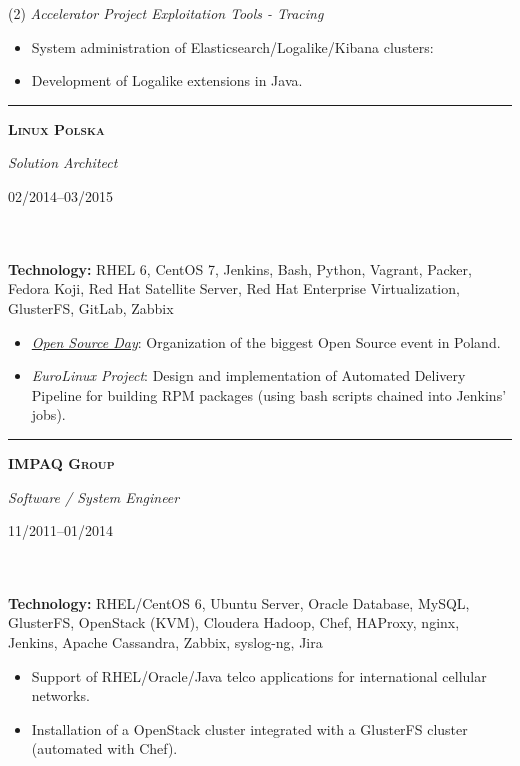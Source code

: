 \documentclass[$fontsize$, a4paper]{article}
\newcommand\textbox[1]{%
  \parbox{.333\textwidth}{#1}%
}
\begin{document}
\vspace{5pt}
(2) \emph{Accelerator Project Exploitation Tools - Tracing}
\begin{itemize}
  \item System administration of Elasticsearch/Logalike/Kibana clusters:
  \item Development of Logalike extensions in Java.
\end{itemize}


\noindent\rule[0.5ex]{\linewidth}{1pt}

\noindent\textbox{\textbf{\textsc{Linux Polska}}\hfill}\textbox{\hfil \emph{Solution Architect}\hfil}\textbox{\hfill 02/2014--03/2015}\\\\
\textbf{Technology:} RHEL 6, CentOS 7, Jenkins, Bash, Python, Vagrant, Packer, Fedora Koji, Red Hat Satellite Server, Red Hat Enterprise Virtualization, GlusterFS, GitLab, Zabbix

\vspace{5pt}
\begin{itemize}
  \item \emph{\href{http://opensourceday.com/}{Open Source Day}}: Organization of the biggest Open Source event in Poland.
\end{itemize}

\begin{itemize}
  \item \emph{EuroLinux Project}: Design and implementation of Automated Delivery Pipeline for building RPM packages (using bash scripts chained into Jenkins' jobs).
\end{itemize}


\noindent\rule[0.5ex]{\linewidth}{1pt}

\noindent\textbox{\textbf{\textsc{IMPAQ Group}}\hfill}\textbox{\hfil \emph{Software / System Engineer}\hfil}\textbox{\hfill 11/2011--01/2014}\\\\
\textbf{Technology:} RHEL/CentOS 6, Ubuntu Server, Oracle Database, MySQL, GlusterFS, OpenStack (KVM), Cloudera Hadoop, Chef, HAProxy, nginx, Jenkins, Apache Cassandra, Zabbix, syslog-ng, Jira

\vspace{10pt}
\begin{itemize}
  \item Support of RHEL/Oracle/Java telco applications for international cellular networks.
  \item Installation of a OpenStack cluster integrated with a GlusterFS cluster (automated with Chef).
\end{itemize}
\end{document}
